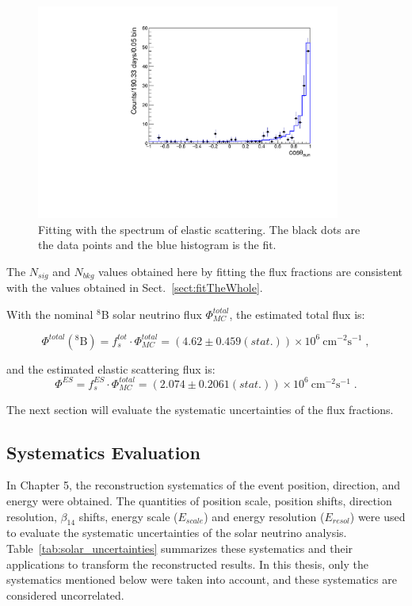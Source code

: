 {\begin{figure}[!htb]
	\centering
	\includegraphics[width=10cm]{ESfluxFit.pdf}
	\caption[Fitting with the spectrum of elastic scattering.]{Fitting with the spectrum of elastic scattering. The black dots are the data points and the blue histogram is the fit.\label{fig:ESfluxFit}}
\end{figure}

The $N_{sig}$ and $N_{bkg}$ values obtained here by fitting the flux fractions are consistent with the values obtained in Sect.~\ref{sect:fitTheWhole}.

With the nominal $^8$B solar neutrino flux $\Phi^{total}_{MC}$, the estimated total flux is:

\begin{equation}
\Phi^{total}(\mathrm{^8 B})=f^{tot}_s\cdot \Phi^{total}_{MC}=(4.62 \pm 0.459(stat.))\times 10^6~\mathrm{cm^{-2}s^{-1}}\; ,
\end{equation}

and the estimated elastic scattering flux is:
\begin{equation}
\Phi^{ES}=f^{ES}_s\cdot \Phi^{total}_{MC}=(2.074\pm 0.2061(stat.))\times 10^6~\mathrm{cm^{-2}s^{-1}}\; .
\end{equation}

The next section will evaluate the systematic uncertainties of the flux fractions.

\subsection{Systematics Evaluation}\label{sect:fluxSystem}
In Chapter 5, the reconstruction systematics of the event position, direction, and energy were obtained. The quantities of position scale, position shifts, direction resolution, $\beta_{14}$ shifts, energy scale ($E_{scale}$) and energy resolution ($E_{resol}$) were used to evaluate the systematic uncertainties of the solar neutrino analysis. Table~\ref{tab:solar_uncertainties} summarizes these systematics and their applications to transform the reconstructed results. In this thesis, only the systematics mentioned below were taken into account, and these systematics are considered uncorrelated. 

}
